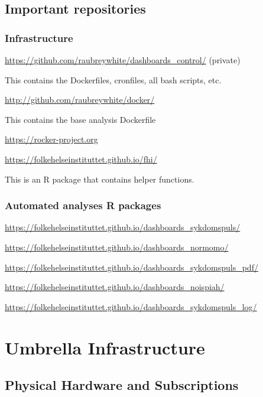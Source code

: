 \documentclass[12pt,]{article}
\begin{document}
\subsection{Important repositories}\label{important-repositories}

\subsubsection{Infrastructure}\label{infrastructure}

\url{https://github.com/raubreywhite/dashboards_control/} (private)

This contains the Dockerfiles, cronfiles, all bash scripts, etc.

\url{http://github.com/raubreywhite/docker/}

This contains the base analysis Dockerfile

\url{https://rocker-project.org}

\url{https://folkehelseinstituttet.github.io/fhi/}

This is an R package that contains helper functions.

\subsubsection{Automated analyses R
packages}\label{automated-analyses-r-packages}

\url{https://folkehelseinstituttet.github.io/dashboards_sykdomspuls/}

\url{https://folkehelseinstituttet.github.io/dashboards_normomo/}

\url{https://folkehelseinstituttet.github.io/dashboards_sykdomspuls_pdf/}

\url{https://folkehelseinstituttet.github.io/dashboards_noispiah/}

\url{https://folkehelseinstituttet.github.io/dashboards_sykdomspuls_log/}

\hypertarget{umbrella}{\section{Umbrella
Infrastructure}\label{umbrella}}

\subsection{Physical Hardware and
Subscriptions}\label{physical-hardware-and-subscriptions}
\end{document}
